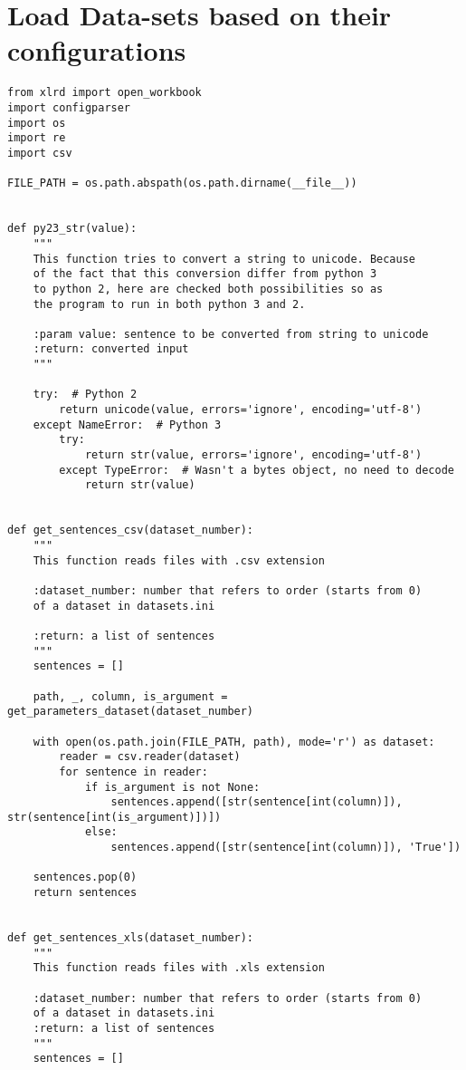 
\chapter{Load Data-sets based on their configurations}

\label{Appendix7}

\begin{lstlisting}[language=iPython]
from xlrd import open_workbook
import configparser
import os
import re
import csv

FILE_PATH = os.path.abspath(os.path.dirname(__file__))


def py23_str(value):
	"""
	This function tries to convert a string to unicode. Because 
	of the fact that this conversion differ from python 3
	to python 2, here are checked both possibilities so as 
	the program to run in both python 3 and 2.
	
	:param value: sentence to be converted from string to unicode
	:return: converted input
	"""
	
	try:  # Python 2
		return unicode(value, errors='ignore', encoding='utf-8')
	except NameError:  # Python 3
		try:
			return str(value, errors='ignore', encoding='utf-8')
		except TypeError:  # Wasn't a bytes object, no need to decode
			return str(value)


def get_sentences_csv(dataset_number):
	"""
	This function reads files with .csv extension
	
	:dataset_number: number that refers to order (starts from 0) 
	of a dataset in datasets.ini
	
	:return: a list of sentences
	"""
	sentences = []
	
	path, _, column, is_argument = get_parameters_dataset(dataset_number)
	
	with open(os.path.join(FILE_PATH, path), mode='r') as dataset:
		reader = csv.reader(dataset)
		for sentence in reader:
			if is_argument is not None:
				sentences.append([str(sentence[int(column)]), str(sentence[int(is_argument)])])
			else:
				sentences.append([str(sentence[int(column)]), 'True'])
	
	sentences.pop(0)
	return sentences


def get_sentences_xls(dataset_number):
	"""
	This function reads files with .xls extension
	
	:dataset_number: number that refers to order (starts from 0) 
	of a dataset in datasets.ini
	:return: a list of sentences
	"""
	sentences = []
	

\end{lstlisting}
